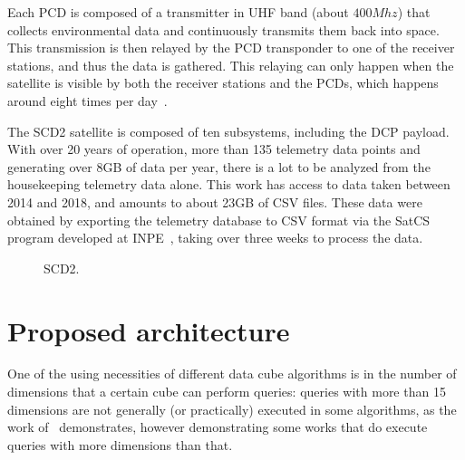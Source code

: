 Each PCD is composed of a transmitter in UHF band (about $400Mhz$) that collects environmental data and continuously transmits them back into space.
This transmission is then relayed by the PCD transponder to one of the receiver stations, and thus the data is gathered.
This relaying can only happen when the satellite is visible by both the receiver stations and the PCDs, which happens around eight times per day~\cite{miguezSCD2OperationHandbook1993}.

The SCD2 satellite is composed of ten subsystems, including the DCP payload.
With over 20 years of operation, more than 135 telemetry data points and generating over 8GB of data per year, there is a lot to be analyzed from the housekeeping telemetry data alone.
This work has access to data taken between 2014 and 2018, and amounts to about 23GB of CSV files.
These data were obtained by exporting the telemetry database to CSV format via the SatCS program developed at INPE~\cite{inpeSATCS2015}, taking over three weeks to process the data.

\begin{figure}[H]
  \caption{SCD2.}\label{fig:scd2_mission}
  \vspace{6mm}
  \begin{center}
  \end{center}
  \vspace{2mm}
\end{figure}

\section{Proposed architecture}\label{ch:prop:static}

One of the using necessities of different data cube algorithms is in the number of dimensions that a certain cube can perform queries: queries with more than 15 dimensions are not generally (or practically) executed in some algorithms, as the work of~ demonstrates, however demonstrating some works that do execute queries with more dimensions than that.

